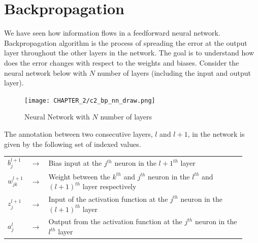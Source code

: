 \section{Backpropagation}
We have seen how information flows in a feedforward neural network. Backpropagation algorithm is the process of spreading the error at the output layer throughout the other layers in the network. The goal is to understand how does the error changes with respect to the weights and biases. Consider the neural network below with $N$ number of layers (including the input and output layer).\vspace{10mm}
\begin{figure}[H]
  \centering
  \texttt{[image: CHAPTER\_2/c2\_bp\_nn\_draw.png]}
  \vspace{10mm}
  \caption{Neural Network with $N$ number of layers}
  \label{fig:bp_nn_complete}
\end{figure}\vspace{10mm}
\noindent The annotation between two consecutive layers, $l$ and $l+1$, in the network is given by the following set of indexed values.
\begin{center}
  \begin{tabular}{p{0.03\linewidth} p{0.03\linewidth} p{0.87\linewidth}}
    $b_j^{l+1}$ & $\rightarrow$ & Bias input at the $j^{th}$ neuron in the ${l+1}^{th}$ layer \\ 
    $w_{jk}^{l+1}$ & $\rightarrow$ & Weight between the $k^{th}$ and $j^{th}$ neuron in the $l^{th}$ and ${(l+1)}^{th}$ layer respectively \\  
    $z_j^{l+1}$ &$\rightarrow$& Input of the activation function at the $j^{th}$ neuron in the $(l+1)^{th}$ layer \\
    $a_j^l$ & $\rightarrow$ & Output from the activation function at the $j^{th}$ neuron in the $l^{th}$ layer
  \end{tabular}
\end{center}
